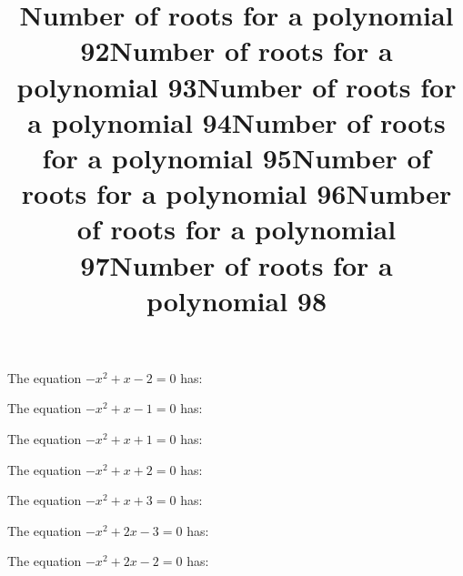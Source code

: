\documentclass{article}
\begin{document}
\begin{category}
\begin{question}[multichoice]
\end{question}
\begin{question}[multichoice]
\title{Number of roots for a polynomial 92}
The equation $- x^{2} + x - 2=0$ has:



\end{question}
\begin{question}[multichoice]
\title{Number of roots for a polynomial 93}
The equation $- x^{2} + x - 1=0$ has:



\end{question}
\begin{question}[multichoice]
\title{Number of roots for a polynomial 94}
The equation $- x^{2} + x + 1=0$ has:



\end{question}
\begin{question}[multichoice]
\title{Number of roots for a polynomial 95}
The equation $- x^{2} + x + 2=0$ has:



\end{question}
\begin{question}[multichoice]
\title{Number of roots for a polynomial 96}
The equation $- x^{2} + x + 3=0$ has:



\end{question}
\begin{question}[multichoice]
\title{Number of roots for a polynomial 97}
The equation $- x^{2} + 2 x - 3=0$ has:



\end{question}
\begin{question}[multichoice]
\title{Number of roots for a polynomial 98}
The equation $- x^{2} + 2 x - 2=0$ has:


\end{question}
\end{category}
\end{document}
